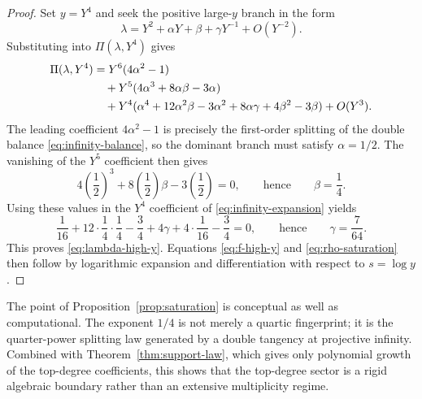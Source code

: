 \begin{proof}
Set $y=Y^4$ and seek the positive large-\(y\) branch in the form
\[
\lambda=Y^2+\alpha Y+\beta+\gamma Y^{-1}+O(Y^{-2}).
\]
Substituting into $\Pi(\lambda,Y^4)$ gives
\begin{align}
\Pi(\lambda,Y^4)
&=
Y^6(4\alpha^2-1) \notag\\
&\quad
+Y^5(4\alpha^3+8\alpha\beta-3\alpha) \notag\\
&\quad
+Y^4(\alpha^4+12\alpha^2\beta-3\alpha^2+8\alpha\gamma+4\beta^2-3\beta)
+O(Y^3). \label{eq:infinity-expansion}
\end{align}
The leading coefficient $4\alpha^2-1$ is precisely the first-order splitting of the double balance \eqref{eq:infinity-balance}, so the dominant branch must satisfy $\alpha=1/2$.
The vanishing of the $Y^5$ coefficient then gives
\[
4\left(\frac12\right)^3+8\left(\frac12\right)\beta-3\left(\frac12\right)=0,
\qquad\text{hence}\qquad
\beta=\frac14.
\]
Using these values in the $Y^4$ coefficient of \eqref{eq:infinity-expansion} yields
\[
\frac{1}{16}+12\cdot \frac14\cdot \frac14-\frac34+4\gamma+4\cdot \frac{1}{16}-\frac34=0,
\qquad\text{hence}\qquad
\gamma=\frac{7}{64}.
\]
This proves \eqref{eq:lambda-high-y}.
Equations \eqref{eq:f-high-y} and \eqref{eq:rho-saturation} then follow by logarithmic expansion and differentiation with respect to $s=\log y$.
\end{proof}

The point of Proposition~\ref{prop:saturation} is conceptual as well as computational.
The exponent \(1/4\) is not merely a quartic fingerprint; it is the quarter-power splitting law generated by a double tangency at projective infinity.
Combined with Theorem~\ref{thm:support-law}, which gives only polynomial growth of the top-degree coefficients, this shows that the top-degree sector is a rigid algebraic boundary rather than an extensive multiplicity regime.
